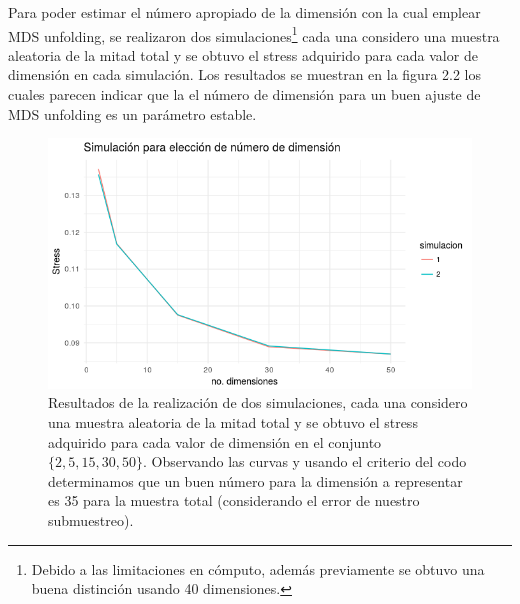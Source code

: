 \documentclass[paper=letter, fontsize=11pt]{scrartcl}
\numberwithin{equation}{section} %
\numberwithin{figure}{section} %
\numberwithin{table}{section} %
\begin{document}
Para poder estimar el número apropiado de la dimensión con la cual emplear MDS unfolding, se realizaron dos simulaciones\footnote{Debido a las limitaciones en cómputo, además previamente se obtuvo una buena distinción usando 40 dimensiones.} cada una considero una muestra aleatoria de la mitad total y se obtuvo el stress adquirido para cada valor de dimensión en cada simulación. Los resultados se muestran en la figura 2.2 los cuales parecen indicar que la el número de dimensión para un buen ajuste de MDS unfolding es un parámetro estable.


\begin{figure}[H]
  \begin{center}
    \includegraphics[scale=0.65]{dimension.png}
    \caption{Resultados de la realización de dos simulaciones, cada una considero una muestra aleatoria de la mitad total y se obtuvo el stress adquirido para cada valor de dimensión en el conjunto  $\{2,5,15,30,50\}$. Observando las curvas y usando el criterio del codo determinamos que un buen número para la dimensión a representar es 35 para la muestra total (considerando el error de nuestro submuestreo). }
    \label{figura2_2}
  \end{center}
\end{figure}
\end{document}
